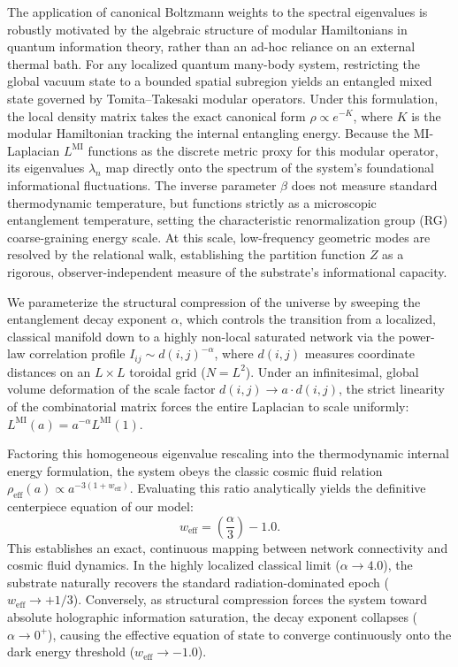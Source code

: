 \documentclass[onecolumn,PRD,amsmath,amssymb,aps,nofootinbib,superscriptaddress,11pt]{revtex4-2}
\begin{document}
The application of canonical Boltzmann weights to the spectral eigenvalues is robustly motivated by the algebraic structure of modular Hamiltonians in quantum information theory, rather than an ad-hoc reliance on an external thermal bath. For any localized quantum many-body system, restricting the global vacuum state to a bounded spatial subregion yields an entangled mixed state governed by Tomita--Takesaki modular operators. Under this formulation, the local density matrix takes the exact canonical form $\rho \propto e^{-K}$, where $K$ is the modular Hamiltonian tracking the internal entangling energy. Because the MI-Laplacian $L^{\text{MI}}$ functions as the discrete metric proxy for this modular operator, its eigenvalues $\lambda_n$ map directly onto the spectrum of the system's foundational informational fluctuations. The inverse parameter $\beta$ does not measure standard thermodynamic temperature, but functions strictly as a microscopic entanglement temperature, setting the characteristic renormalization group (RG) coarse-graining energy scale. At this scale, low-frequency geometric modes are resolved by the relational walk, establishing the partition function $Z$ as a rigorous, observer-independent measure of the substrate's informational capacity.

We parameterize the structural compression of the universe by sweeping the entanglement decay exponent $\alpha$, which controls the transition from a localized, classical manifold down to a highly non-local saturated network via the power-law correlation profile $I_{ij} \sim d(i, j)^{-\alpha}$, where $d(i,j)$ measures coordinate distances on an $L \times L$ toroidal grid ($N = L^2$). Under an infinitesimal, global volume deformation of the scale factor $d(i,j) \to a \cdot d(i,j)$, the strict linearity of the combinatorial matrix forces the entire Laplacian to scale uniformly: $L^{\text{MI}}(a) = a^{-\alpha} L^{\text{MI}}(1)$. 

Factoring this homogeneous eigenvalue rescaling into the thermodynamic internal energy formulation, the system obeys the classic cosmic fluid relation $\rho_{\text{eff}}(a) \propto a^{-3(1+w_{\text{eff}})}$. Evaluating this ratio analytically yields the definitive centerpiece equation of our model:
\begin{equation}
w_{\text{eff}} = \left( \frac{\alpha}{3} \right) - 1.0.
\end{equation}
This establishes an exact, continuous mapping between network connectivity and cosmic fluid dynamics. In the highly localized classical limit ($\alpha \rightarrow 4.0$), the substrate naturally recovers the standard radiation-dominated epoch ($w_{\text{eff}} \rightarrow +1/3$). Conversely, as structural compression forces the system toward absolute holographic information saturation, the decay exponent collapses ($\alpha \rightarrow 0^+$), causing the effective equation of state to converge continuously onto the dark energy threshold ($w_{\text{eff}} \rightarrow -1.0$).
\end{document}
